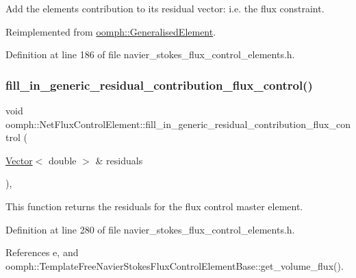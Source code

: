 Add the element\textquotesingle{}s contribution to its residual vector\+: i.\+e. the flux constraint. 



Reimplemented from \hyperlink{classoomph_1_1GeneralisedElement_a310c97f515e8504a48179c0e72c550d7}{oomph\+::\+Generalised\+Element}.



Definition at line 186 of file navier\+\_\+stokes\+\_\+flux\+\_\+control\+\_\+elements.\+h.

\mbox{\label{classoomph_1_1NetFluxControlElement_a1904cdd012883add53cb41253d1effaf}} 
\subsubsection{\texorpdfstring{fill\+\_\+in\+\_\+generic\+\_\+residual\+\_\+contribution\+\_\+flux\+\_\+control()}{fill\_in\_generic\_residual\_contribution\_flux\_control()}}
{\footnotesize\ttfamily void oomph\+::\+Net\+Flux\+Control\+Element\+::fill\+\_\+in\+\_\+generic\+\_\+residual\+\_\+contribution\+\_\+flux\+\_\+control (\begin{DoxyParamCaption}\item[{\hyperlink{classoomph_1_1Vector}{Vector}$<$ double $>$ \&}]{residuals }\end{DoxyParamCaption})\hspace{0.3cm}{\ttfamily [inline]}, {\ttfamily [protected]}}



This function returns the residuals for the flux control master element. 



Definition at line 280 of file navier\+\_\+stokes\+\_\+flux\+\_\+control\+\_\+elements.\+h.



References e, and oomph\+::\+Template\+Free\+Navier\+Stokes\+Flux\+Control\+Element\+Base\+::get\+\_\+volume\+\_\+flux().

